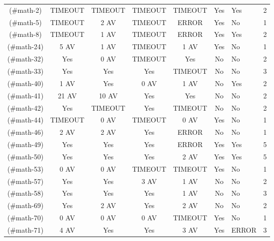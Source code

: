 \begin{table}[!t]
{\begin{tabular}{|c|c|c|c|c|c|}
\hline
[M2](#math-2)     & TIMEOUT   & TIMEOUT   & TIMEOUT   & TIMEOUT   & Yes       & Yes       &      2 \\
[M5](#math-5)     & TIMEOUT   & 2 AV      & TIMEOUT   & ERROR     & Yes       & No        &      1 \\
[M8](#math-8)     & TIMEOUT   & 1 AV      & TIMEOUT   & ERROR     & Yes       & Yes       &      2 \\
[M24](#math-24)   & 5 AV      & 1 AV      & TIMEOUT   & 1 AV      & Yes       & No        &      1 \\
[M32](#math-32)   & Yes       & 0 AV      & TIMEOUT   & Yes       & No        & No        &      2 \\
[M33](#math-33)   & Yes       & Yes       & Yes       & TIMEOUT   & No        & No        &      3 \\
[M40](#math-40)   & 1 AV      & Yes       & 0 AV      & 1 AV      & No        & Yes       &      2 \\
[M41](#math-41)   & 21 AV     & 10 AV     & Yes       & Yes       & No        & No        &      2 \\
[M42](#math-42)   & Yes       & TIMEOUT   & Yes       & TIMEOUT   & No        & No        &      2 \\
[M44](#math-44)   & TIMEOUT   & 0 AV      & TIMEOUT   & 0 AV      & Yes       & No        &      1 \\
[M46](#math-46)   & 2 AV      & 2 AV      & Yes       & ERROR     & No        & No        &      1 \\
[M49](#math-49)   & Yes       & Yes       & Yes       & ERROR     & Yes       & Yes       &      5 \\
[M50](#math-50)   & Yes       & Yes       & Yes       & 2 AV      & Yes       & Yes       &      5 \\
[M53](#math-53)   & 0 AV      & 0 AV      & TIMEOUT   & TIMEOUT   & Yes       & No        &      1 \\
[M57](#math-57)   & Yes       & Yes       & 3 AV      & 1 AV      & No        & No        &      2 \\
[M58](#math-58)   & Yes       & Yes       & Yes       & 1 AV      & No        & No        &      3 \\
[M69](#math-69)   & Yes       & 2 AV      & Yes       & 2 AV      & No        & No        &      2 \\
[M70](#math-70)   & 0 AV      & 0 AV      & 0 AV      & TIMEOUT   & Yes       & No        &      1 \\
[M71](#math-71)   & 4 AV      & Yes       & Yes       & 3 AV      & Yes       & ERROR     &      3 \\

\end{tabular}}
\end{table}
